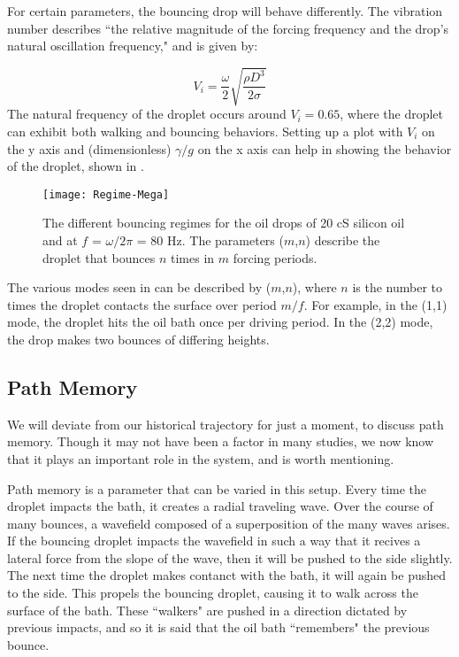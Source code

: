 For certain parameters, the bouncing drop will behave differently. The vibration number describes ``the relative magnitude of the forcing frequency and the drop's natural oscillation frequency," and is given by:
	       	      
\begin{equation} \label{vibrationnumber}
V_i = \frac{\omega}{2}\sqrt{\frac{\rho D^3}{2\sigma}}
\end{equation}   	       	       
	       	       The natural frequency of the droplet occurs around $V_i = 0.65$, where the droplet can exhibit both walking and bouncing behaviors. Setting up a plot with $V_i$ on the y axis and (dimensionless) ${\gamma}/{g}$ on the x axis can help in showing the behavior of the droplet, shown in . 
	    
	    \begin{figure}[h]
	   
	       \centering
	    \texttt{[image: Regime-Mega]}
	     \caption{The different bouncing regimes for the oil drops of 20 cS silicon oil and at $f$ = $\omega / 2\pi$ = 80 Hz. The parameters ($m$,$n$) describe the droplet that bounces $n$ times in $m$ forcing periods. }
	 \label{regime}
	\end{figure}

The various modes seen in  can be described by ($m$,$n$), where $n$ is the number to times the droplet contacts the surface over period $m/f$. For example, in the (1,1) mode, the droplet hits the oil bath once per driving period. In the (2,2) mode, the drop makes two bounces of differing heights. 
	       
            \subsection{Path Memory}
            We will deviate from our historical trajectory for just a moment, to discuss path memory. Though it may not have been a factor in many studies, we now know that it plays an important role in the system, and is worth mentioning. 
                        
            Path memory is a parameter that can be varied in this setup. Every time the droplet impacts the bath, it creates a radial traveling wave. Over the course of many bounces, a wavefield composed of a superposition of the many waves arises. If the bouncing droplet impacts the wavefield in such a way that it recives a lateral force from the slope of the wave, then it will be pushed to the side slightly. The next time the droplet makes contanct with the bath, it will again be pushed to the side. This propels the bouncing droplet, causing it to walk across the surface of the bath. These ``walkers" are pushed in a direction dictated by previous impacts, and so it is said that the oil bath ``remembers" the previous bounce.	  
            
